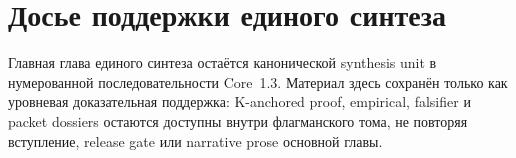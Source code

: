 \section{Досье поддержки единого синтеза}
\label{sec:oc-core-1-3-synthesis-support-dossiers}

Главная глава единого синтеза остаётся канонической synthesis unit в
нумерованной последовательности Core~1.3. Материал здесь сохранён только как
уровневая доказательная поддержка: K-anchored proof, empirical, falsifier и
packet dossiers остаются доступны внутри флагманского тома, не повторяя
вступление, release gate или narrative prose основной главы.


